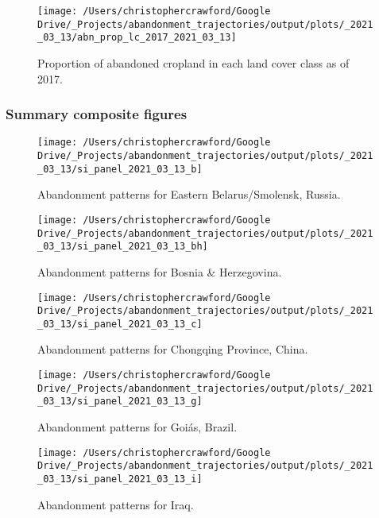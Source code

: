 \documentclass[
]{article}
\begin{document}
\begin{figure}
\texttt{[image: /Users/christophercrawford/Google Drive/\_Projects/abandonment\_trajectories/output/plots/\_2021\_03\_13/abn\_prop\_lc\_2017\_2021\_03\_13]} \caption{Proportion of abandoned cropland in each land cover class as of 2017.}\label{fig:abn-prop-lc}
\end{figure}

\hypertarget{summary-composite-figures}{%
\subsubsection{Summary composite figures}\label{summary-composite-figures}}













\begin{figure}
\texttt{[image: /Users/christophercrawford/Google Drive/\_Projects/abandonment\_trajectories/output/plots/\_2021\_03\_13/si\_panel\_2021\_03\_13\_b]} \caption{Abandonment patterns for Eastern Belarus/Smolensk, Russia.}\label{fig:panel-b}
\end{figure}

\begin{figure}
\texttt{[image: /Users/christophercrawford/Google Drive/\_Projects/abandonment\_trajectories/output/plots/\_2021\_03\_13/si\_panel\_2021\_03\_13\_bh]} \caption{Abandonment patterns for Bosnia \& Herzegovina.}\label{fig:panel-bh}
\end{figure}

\begin{figure}
\texttt{[image: /Users/christophercrawford/Google Drive/\_Projects/abandonment\_trajectories/output/plots/\_2021\_03\_13/si\_panel\_2021\_03\_13\_c]} \caption{Abandonment patterns for Chongqing Province, China.}\label{fig:panel-c}
\end{figure}

\begin{figure}
\texttt{[image: /Users/christophercrawford/Google Drive/\_Projects/abandonment\_trajectories/output/plots/\_2021\_03\_13/si\_panel\_2021\_03\_13\_g]} \caption{Abandonment patterns for Goiás, Brazil.}\label{fig:panel-g}
\end{figure}

\begin{figure}
\texttt{[image: /Users/christophercrawford/Google Drive/\_Projects/abandonment\_trajectories/output/plots/\_2021\_03\_13/si\_panel\_2021\_03\_13\_i]} \caption{Abandonment patterns for Iraq.}\label{fig:panel-i}
\end{figure}
\end{document}
